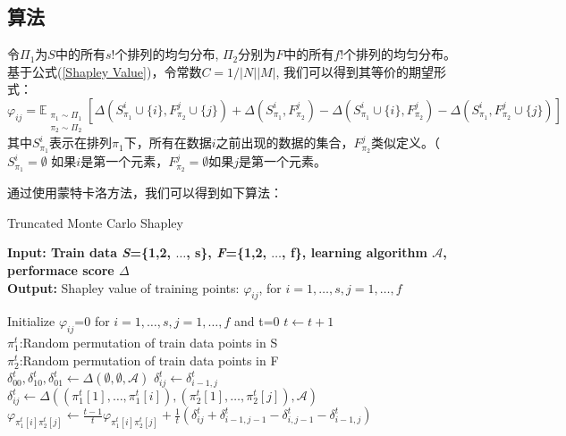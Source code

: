 \subsection{算法}
令$\Pi_1$为$S$中的所有$s!$个排列的均匀分布, $\Pi_2$分别为$F$中的所有$f!$个排列的均匀分布。
基于公式(\ref{Shapley Value})，令常数$C=1/|N||M|$, 我们可以得到其等价的期望形式：
\begin{equation}
	\varphi_{ij}=\mathbb{E}_{\substack{\pi_1\sim\Pi_1\\\pi_2\sim\Pi_2}}[\Delta(S_{\pi_1}^i\cup\{i\}, F_{\pi_2}^j\cup\{j\})
	+\Delta(S_{\pi_1}^i,F_{\pi_2}^j)-\Delta(S_{\pi_1}^i\cup\{i\}, F_{\pi_2}^j)-\Delta(S_{\pi_1}^i, F_{\pi_2}^j\cup\{j\})]
\end{equation}
其中$S_{\pi_1}^i$表示在排列$\pi_1$下，所有在数据$i$之前出现的数据的集合，$F_{\pi_2}^j$类似定义。（$S_{\pi_1}^i=\emptyset$ 如果$i$是第一个元素，$F_{\pi_2}^j=\emptyset$如果$j$是第一个元素。

通过使用蒙特卡洛方法，我们可以得到如下算法：
\begin{algorithm}[H]
	\caption{ Truncated Monte Carlo Shapley} %
	\label{alg}
	\hspace*{0.02in} {\bf Input: Train data \textsl{S}=\{1,2, $\dots$, s\}, \textsl{F}=\{1,2, $\dots$, f\}, learning algorithm 
		$\mathcal{A}$, performace score $\Delta$}\\ %
	\hspace*{0.02in} {\bf Output:} %
	Shapley value of training points: $\varphi_{ij}$, for $i=1,\dots,s, j=1,\dots,f$
	\begin{algorithmic}[1]
		\State Initialize $\varphi_{ij}$=0 for $i=1,\dots,s, j=1,\dots,f$ and t=0 %
		\State $t\leftarrow t+1$\\
		$\pi_1^t$:Random permutation of train data points in S\\
		$\pi_2^t$:Random permutation of train data points in F\\
		$\delta_{00}^t, \delta_{10}^t, \delta_{01}^t\leftarrow \Delta(\emptyset,\emptyset, \mathcal{A})$
		\State $\delta_{ij}^t\leftarrow\delta_{i-1,j}^{t}$
		\Else \quad$\delta_{ij}^t\leftarrow \Delta((\pi_1^t[1],\dots,\pi_1^t[i]),(\pi_2^t[1],\dots,\pi_2^t[j]),\mathcal{A})$
		\EndIf 
		\State $\varphi_{\pi_1^t[i]\pi_2^t[j]}\leftarrow \frac{t-1}{t}\varphi_{\pi_1^t[i]\pi_2^t[j]}+\frac{1}{t}(\delta_{ij}^t+
		\delta_{i-1,j-1}^t-\delta_{i,j-1}^t-\delta_{i-1,j}^t)$
		\EndFor 
		\EndFor 
		\EndWhile 
	\end{algorithmic}
\end{algorithm}

